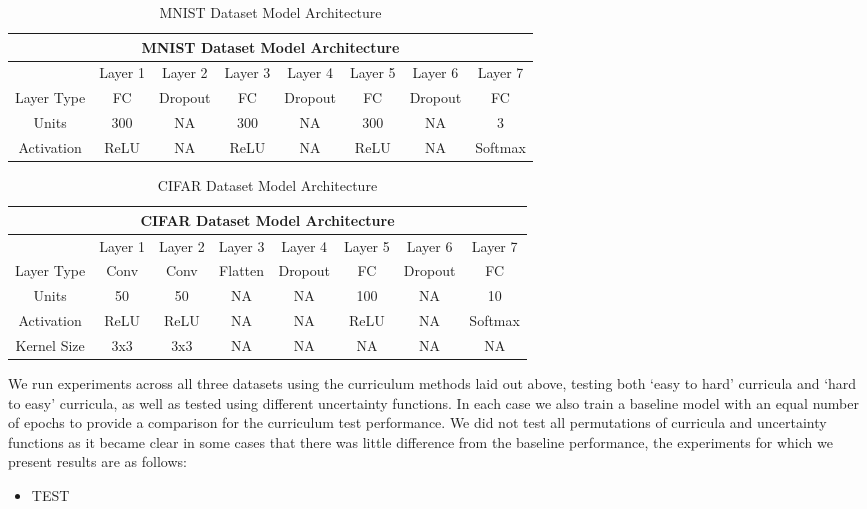 \begin{table}[h!]
\caption{MNIST Dataset Model Architecture} \label{tab:MNISTArchitecture}
\begin{tabular}{|c||c|c|c|c|c|c|c|}
\hline
\multicolumn{8}{|c|}{MNIST Dataset Model Architecture} \\
\hline
 & Layer 1 & Layer 2 & Layer 3& Layer 4 &Layer 5 & Layer 6 & Layer 7 \\
\hline
\hline
Layer Type & FC & Dropout & FC & Dropout & FC & Dropout  & FC \\
\hline
Units & 300 & NA & 300 & NA & 300 & NA & 3 \\
\hline
Activation & ReLU & NA & ReLU & NA & ReLU & NA & Softmax \\
\hline
\end{tabular}
\end{table}

\begin{table}[h!]
\caption{CIFAR Dataset Model Architecture} \label{tab:CIFARArchitecture}
\begin{tabular}{|c||c|c|c|c|c|c|c|}
\hline
\multicolumn{8}{|c|}{CIFAR Dataset Model Architecture} \\
\hline
 & Layer 1 & Layer 2 & Layer 3& Layer 4 &Layer 5 & Layer 6 & Layer 7 \\
\hline
\hline
Layer Type & Conv & Conv & Flatten & Dropout & FC & Dropout  & FC \\
\hline
Units & 50 & 50 & NA & NA & 100 & NA & 10 \\
\hline
Activation & ReLU &ReLU & NA & NA & ReLU & NA & Softmax \\
\hline
Kernel Size & 3x3 &3x3 & NA &NA &NA &NA &NA  \\
\hline
\end{tabular}
\end{table}

We run experiments across all three datasets using the curriculum methods laid out above, testing both `easy to hard' curricula and `hard to easy' curricula, as well as tested using different uncertainty functions. In each case we also train a baseline model with an equal number of epochs to provide a comparison for the curriculum test performance. We did not test all permutations of curricula and uncertainty functions as it became clear in some cases that there was little difference from the baseline performance, the experiments for which we present results are as follows:
\begin{itemize}
\item TEST

\end{itemize}


